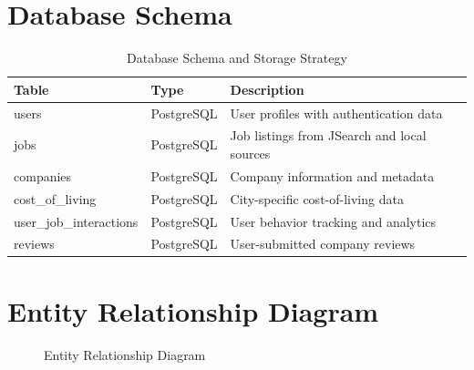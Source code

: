 \documentclass[12pt,a4paper,oneside]{report}
\begin{document}
\section{Database Schema}

\begin{table}[H]
\centering
\caption{Database Schema and Storage Strategy}
\label{tab:schema}
\begin{tabular}{|l|l|p{6cm}|}
\hline
\textbf{Table} & \textbf{Type} & \textbf{Description} \\
\hline
users & PostgreSQL & User profiles with authentication data \\
\hline
jobs & PostgreSQL & Job listings from JSearch and local sources \\
\hline
companies & PostgreSQL & Company information and metadata \\
\hline
cost\_of\_living & PostgreSQL & City-specific cost-of-living data \\
\hline
user\_job\_interactions & PostgreSQL & User behavior tracking and analytics \\
\hline
reviews & PostgreSQL & User-submitted company reviews \\
\hline
\end{tabular}
\end{table}

\section{Entity Relationship Diagram}

\begin{figure}[H]
\centering
{}
\caption{Entity Relationship Diagram}
\label{fig:erd}
\end{figure}
\end{document}
